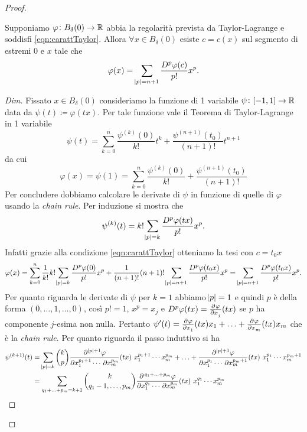 \begin{proof}
	\begin{lemma}[Lagrange]
		Supponiamo $ \varphi \colon B_\delta(0) \to \mathbb{R} $ abbia la regolarità prevista da Taylor-Lagrange e soddisfi \eqref{eqn:carattTaylor}. Allora $ \forall x \in B_\delta(0) $ esiste $ c = c(x) $ sul segmento di estremi 0 e $ x $ tale che
		\[
			\varphi(x) = \sum_{\abs{p} = n + 1} \frac{D^p \varphi(c)}{p!} x^p.
		\]
	\end{lemma}
	\begin{proof}[Dim]
		Fissato $ x \in B_\delta(0) $ consideriamo la funzione di 1 variabile $ \psi \colon [-1, 1] \to \mathbb{R} $ data da $ \psi(t) \coloneqq \varphi(tx) $. Per tale funzione vale il Teorema di Taylor-Lagrange in 1 variabile
		\[
			\psi(t) = \sum_{k = 0}^{n} \frac{\psi^{(k)}(0)}{k!} t^k + \frac{\psi^{(n + 1)}(t_0)}{(n + 1)!}t^{n + 1}
		\]
		da cui
		\[
			\varphi(x) = \psi(1) = \sum_{k = 0}^{n} \frac{\psi^{(k)}(0)}{k!} + \frac{\psi^{(n + 1)}(t_0)}{(n + 1)!}
		\]
		Per concludere dobbiamo calcolare le derivate di $ \psi $ in funzione di quelle di $ \varphi $ usando la \emph{chain rule}. Per induzione si mostra che 
		\[
			\psi^{(k)}(t) = k! \sum_{\abs{p} = k} \frac{D^p \varphi(tx)}{p!} x^p.
		\]
		Infatti grazie alla condizione \eqref{eqn:carattTaylor} otteniamo la tesi con $ c = t_0 x $
		\[
			\varphi(x) = \sum_{k = 0}^{n} \frac{1}{k!} k! \sum_{\abs{p} = k} \frac{D^p \varphi(0)}{p!} x^p + \frac{1}{(n + 1)!} (n + 1)! \sum_{\abs{p} = n + 1} \frac{D^p \varphi(t_0x)}{p!} x^p = \sum_{\abs{p} = n + 1} \frac{D^p \varphi(t_0x)}{p!} x^p.
		\]
		Per quanto riguarda le derivate di $ \psi $ per $ k = 1 $ abbiamo $ \abs{p} = 1 $ e quindi $ p $ è della forma $ (0, \ldots, 1, \ldots, 0) $, così $ p! = 1 $, $ x^p = x_j $ e $ D^p\varphi(tx) = \pd{\varphi}{x_j}(tx) $ se $ p $ ha componente $ j $-esima non nulla. Pertanto $ \psi'(t) = \pd{\varphi}{x_1}(tx) x_1 + \ldots + \pd{\varphi}{x_m}(tx) x_m $ che è la \emph{chain rule}. Per quanto riguarda il passo induttivo si ha		
		\begin{align*}
			\psi^{(k + 1)}(t) & = \sum_{\abs{p} = k} \binom{k}{p} \dfrac{\partial^{\,\abs{p} + 1}{\varphi}}{\partial{x_1^{p_1 + 1}} \cdots \, \partial{x_m^{p_m}}} (tx)  \ x_1^{p_1 + 1} \cdots x_m^{p_m} + \ldots + \dfrac{\partial^{\,\abs{p} + 1}{\varphi}}{\partial{x_1^{p_1}} \cdots \, \partial{x_m^{p_m + 1}}} (tx)  \ x_1^{p_1} \cdots x_m^{p_m + 1} \\
			& = \sum_{q_1 + \ldots + p_m = k + 1} \binom{k}{q_1 - 1, \ldots, p_m} \dfrac{\partial^{\,q_1 + \ldots + p_m}{\varphi}}{\partial{x_1^{q_1}} \cdots \, \partial{x_m^{p_m}}} (tx)  \ x_1^{q_1} \cdots x_m^{p_m} \\

\end{align*}
\end{proof}
\end{proof}
